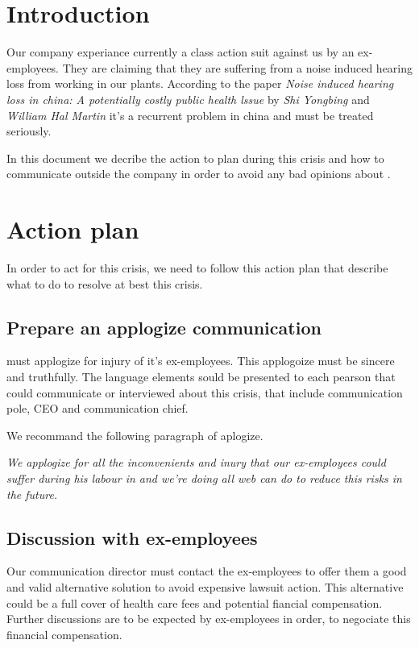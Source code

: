 \section{Introduction}

Our company \moldco experiance currently a class action suit against us by an ex-employees. They are claiming that they are suffering from a noise induced hearing loss from working in our plants. 
According to the paper \emph{Noise induced hearing loss in china: A potentially costly public health lssue} by \emph{Shi Yongbing} and \emph{William Hal Martin} it's a recurrent problem in china and must be treated seriously.

In this document we decribe the action to plan during this crisis and how to communicate outside the company in order to avoid any bad opinions about \moldco.

\section{Action plan}

In order to act for this crisis, we need to follow this action plan that describe what to do to resolve at best this crisis.

\subsection{Prepare an applogize communication}

\moldco must applogize for injury of it's ex-employees.
This applogoize must be sincere and truthfully.
The language elements sould be presented to each pearson that could communicate or interviewed about this crisis, that include communication pole, CEO and communication chief.

We recommand the following paragraph of aplogize.

\bigskip

\emph{We applogize for all the inconvenients and inury that our ex-employees could suffer during his labour in \moldco and we're doing all web can do to reduce this risks in the future.}

\bigskip

\subsection{Discussion with ex-employees}

Our communication director must contact the ex-employees to offer them a good and valid alternative solution to avoid expensive lawsuit action.
This alternative could be a full cover of health care fees and potential fiancial compensation.
Further discussions are to be expected by ex-employees in order, to negociate this financial compensation.

